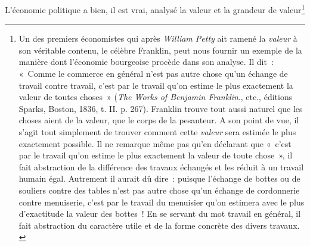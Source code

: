 \documentclass[french,twoside]{book} %
\begin{document}
L’économie politique a bien, il est vrai, analysé la valeur et la grandeur de valeur\footnote{ \noindent Un des premiers économistes qui après \emph{William Petty} ait ramené la \emph{valeur} à son véritable contenu, le célèbre Franklin, peut nous fournir un exemple de la manière dont l’économie bourgeoise procède dans son analyse. Il dit : « Comme le commerce en général n’est pas autre chose qu’un échange de travail contre travail, c’est par le travail qu’on estime le plus exactement la valeur de toutes choses » (\emph{The Works of Benjamin Franklin}., etc., éditions Sparks, Boston, 1836, t. II. p. 267). Franklin trouve tout aussi naturel que les choses aient de la valeur, que le corps de la pesanteur. A son point de vue, il s’agit tout simplement de trouver comment cette \emph{valeur} sera estimée le plus exactement possible. Il ne remarque même pas qu’en déclarant que « c’est par le travail qu’on estime le plus exactement la valeur de toute chose », il fait abstraction de la différence des travaux échangés et les réduit à un travail humain égal. Autrement il aurait dû dire : puisque l’échange de bottes ou de souliers contre des tables n’est pas autre chose qu’un échange de cordonnerie contre menuiserie, c’est par le travail du menuisier qu’on estimera avec le plus d’exactitude la valeur des bottes ! En se servant du mot travail en général, il fait abstraction du caractère utile et de la forme concrète des divers travaux. \\
}
\end{document}
